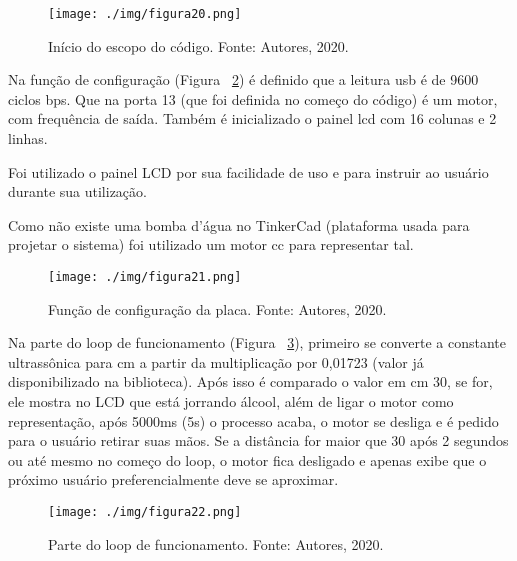 \documentclass[10pt,twocolumn,letterpaper]{article}
\begin{document}
{
\begin{figure}[!h]
\begin{center}
   \texttt{[image: ./img/figura20.png]}
\end{center}
   \caption{ Início do escopo do código. Fonte: Autores, 2020.}
\label{fig:figura20}
\end{figure}
} 

Na função de configuração (Figura ~\ref{fig:figura21}) é definido que a leitura usb é de 9600 ciclos bps. Que na porta 13 (que foi definida no começo do código) é um motor, com frequência de saída. Também é inicializado o painel lcd com 16 colunas e 2 linhas.

Foi utilizado o painel LCD por sua facilidade de uso e para instruir ao usuário durante sua utilização. 

Como não existe uma bomba d’água no TinkerCad (plataforma usada para projetar o sistema) foi utilizado um motor cc para representar tal. 

{
\begin{figure}[!h]
\begin{center}
   \texttt{[image: ./img/figura21.png]}
\end{center}
   \caption{  Função de configuração da placa. Fonte: Autores, 2020. }
\label{fig:figura21}
\end{figure}
} 

Na parte do loop de funcionamento (Figura ~\ref{fig:figura22}), primeiro se converte a constante ultrassônica para cm a partir da multiplicação por 0,01723 (valor já disponibilizado na biblioteca). Após isso é comparado o valor em cm 30, se for, ele mostra no LCD que está jorrando álcool, além de ligar o motor como representação, após 5000ms (5s) o processo acaba, o motor se desliga e é pedido para o usuário retirar suas mãos. Se a distância for maior que 30 após 2 segundos ou até mesmo no começo do loop, o motor fica desligado e apenas exibe que o próximo usuário preferencialmente deve se aproximar.

{
\begin{figure}[!h]
\begin{center}
   \texttt{[image: ./img/figura22.png]}
\end{center}
   \caption{  Parte do loop de funcionamento. Fonte: Autores, 2020. }
\label{fig:figura22}
\end{figure}
} 
\end{document}
